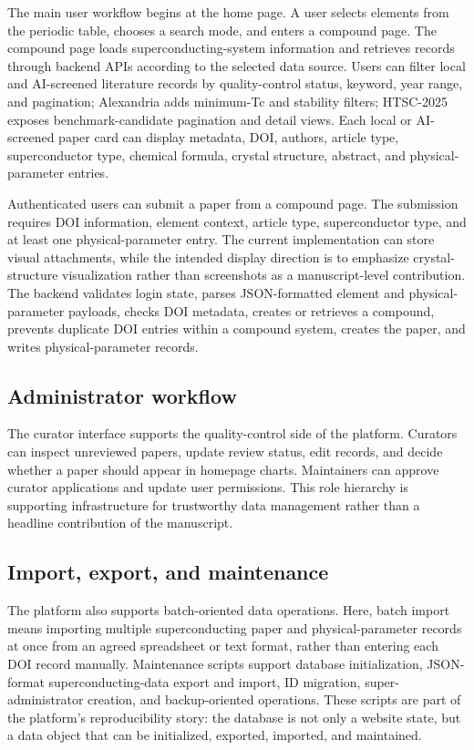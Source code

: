 \documentclass[11pt,a4paper]{article}
\begin{document}
The main user workflow begins at the home page. A user selects elements from the periodic table, chooses a search mode, and enters a compound page. The compound page loads superconducting-system information and retrieves records through backend APIs according to the selected data source. Users can filter local and AI-screened literature records by quality-control status, keyword, year range, and pagination; Alexandria adds minimum-Tc and stability filters; HTSC-2025 exposes benchmark-candidate pagination and detail views. Each local or AI-screened paper card can display metadata, DOI, authors, article type, superconductor type, chemical formula, crystal structure, abstract, and physical-parameter entries.

Authenticated users can submit a paper from a compound page. The submission requires DOI information, element context, article type, superconductor type, and at least one physical-parameter entry. The current implementation can store visual attachments, while the intended display direction is to emphasize crystal-structure visualization rather than screenshots as a manuscript-level contribution. The backend validates login state, parses JSON-formatted element and physical-parameter payloads, checks DOI metadata, creates or retrieves a compound, prevents duplicate DOI entries within a compound system, creates the paper, and writes physical-parameter records.

\subsection{Administrator workflow}

The curator interface supports the quality-control side of the platform. Curators can inspect unreviewed papers, update review status, edit records, and decide whether a paper should appear in homepage charts. Maintainers can approve curator applications and update user permissions. This role hierarchy is supporting infrastructure for trustworthy data management rather than a headline contribution of the manuscript.

\subsection{Import, export, and maintenance}

The platform also supports batch-oriented data operations. Here, batch import means importing multiple superconducting paper and physical-parameter records at once from an agreed spreadsheet or text format, rather than entering each DOI record manually. Maintenance scripts support database initialization, JSON-format superconducting-data export and import, ID migration, super-administrator creation, and backup-oriented operations. These scripts are part of the platform's reproducibility story: the database is not only a website state, but a data object that can be initialized, exported, imported, and maintained.
\end{document}
